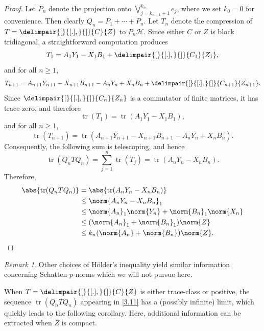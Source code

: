 \documentclass[10pt,reqno]{amsart}
\theoremstyle{remark}
\newtheorem*{remar}{Remark}
\newcommand{\Hil}{\mathcal{H}}
\DeclareMathOperator{\trace}{tr}
\newcommand{\comm}{\delimpair{[}{[.],}{]}}
\numberwithin{equation}{section}
\begin{document}
\begin{proof}
  Let $P_n$ denote the projection onto $\bigvee_{j=k_{n-1}+1}^{k_n} e_j$, where we set $k_0 = 0$ for convenience.
  Then clearly $Q_n = P_1 + \cdots + P_n$.
  Let $T_n$ denote the compression of $T = \comm{C}{Z}$ to $P_n\Hil$.
  Since either $C$ or $Z$ is block tridiagonal, a straightforward computation produces
  \begin{equation*}
    T_1 = A_1 Y_1 - X_1 B_1 + \comm{C_1}{Z_1},
  \end{equation*}
  and for all $n \ge 1$,
  \begin{equation*}
    T_{n+1} = A_{n+1} Y_{n+1} - X_{n+1} B_{n+1} - A_n Y_n + X_n B_n + \comm{C_{n+1}}{Z_{n+1}}.
  \end{equation*}
  Since $\comm{C_n}{Z_n}$ is a commutator of finite matrices, it has trace zero, and therefore
  \begin{equation*}
    \trace(T_1) = \trace(A_1 Y_1 - X_1 B_1),
  \end{equation*}
  and for all $n \ge 1$,
  \begin{equation*}
    \trace(T_{n+1}) = \trace(A_{n+1} Y_{n+1} - X_{n+1} B_{n+1} - A_n Y_n + X_n B_n).
  \end{equation*}
  Consequently, the following sum is telescoping, and hence
  \begin{equation}
    \label{eq:telescoping-partial-trace}
    \trace(Q_nTQ_n) = \sum_{j=1}^n \trace(T_j) = \trace(A_n Y_n - X_n B_n).
  \end{equation}
  Therefore,
  \begin{align*}
    \abs{\trace(Q_n T Q_n)} &= \abs{\trace(A_n Y_n - X_n B_n)} \\
                            &\le \norm{A_n Y_n - X_n B_n}_1 \\
                            &\le \norm{A_n}_1 \norm{Y_n} + \norm{B_n}_1 \norm{X_n} \\
                            &\le (\norm{A_n}_1 + \norm{B_n}_1) \norm{Z} \\
                            &\le k_n(\norm{A_n} + \norm{B_n}) \norm{Z}. \qedhere
  \end{align*}
\end{proof}

\begin{remar}
  Other choices of H\"{o}lder's inequality yield similar information concerning Schatten $p$-norms which we will not pursue here.
\end{remar}

When $T = \comm{C}{Z}$ is either trace-class or positive, the sequence $\trace(Q_n T Q_n)$ appearing in \eqref{3.11} has a (possibly infinite) limit, which quickly leads to the following corollary.
Here, additional information can be extracted when $Z$ is compact.
\end{document}
